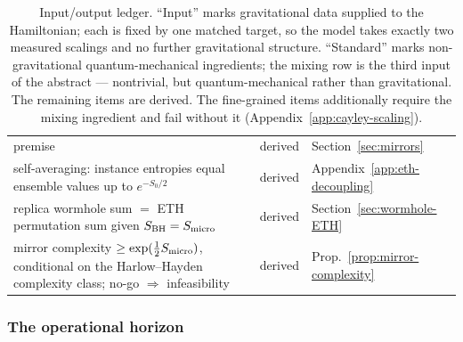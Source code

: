 \documentclass[12pt]{article}
\newcommand{\Smicro}{S_{\rm micro}}
\begin{document}
\begin{table}[H]
\begin{tabular}{p{2.7in}lp{2.6in}}
premise & derived & Section~\ref{sec:mirrors} \\
self-averaging: instance entropies equal ensemble values up to
$e^{-S_0/2}$ & derived & Appendix~\ref{app:eth-decoupling} \\
replica wormhole sum $=$ ETH permutation sum given $S_{\rm BH}=\Smicro$ &
derived & Section~\ref{sec:wormhole-ETH} \\
mirror complexity $\geq\exp(\frac{1}{2}\Smicro)$, conditional on the
Harlow--Hayden complexity class; no-go $\Rightarrow$
infeasibility & derived & Prop.~\ref{prop:mirror-complexity} \\
\bottomrule
\end{tabular}
\caption{Input/output ledger.  ``Input'' marks gravitational data supplied to
the Hamiltonian; each is fixed by one matched target, so the model takes
exactly two measured scalings and no further gravitational structure.
``Standard'' marks non-gravitational quantum-mechanical ingredients; the
mixing row is the third input of the abstract --- nontrivial, but
quantum-mechanical rather than gravitational.  The
remaining items are derived.  The fine-grained items additionally require the
mixing ingredient and fail without it
(Appendix~\ref{app:cayley-scaling}).}
\label{tab:ledger}
\end{table}

\subsubsection*{The operational horizon}
\end{document}
